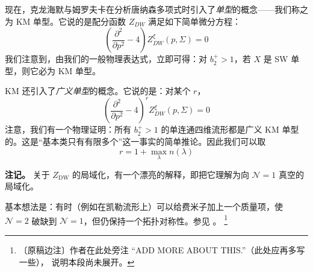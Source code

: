 现在，克龙海默与姆罗夫卡在分析唐纳森多项式时引入了\emph{单型}的概念——我们称之为 KM 单型。它说的是配分函数 $Z_{DW}$ 满足如下简单微分方程：
\begin{equation}
\left(\frac{\partial^{2}}{\partial p^{2}}-4\right)Z_{DW}^{\xi}(p,\Sigma)=0
\tag{9.2}
\end{equation}
我们注意到，由我们的一般物理表达式，立即可得：对 $b_2^{+}>1$，若 $X$ 是 SW 单型，则它必为 KM 单型。

KM 还引入了\emph{广义单型}的概念。它说的是：对某个 $r$，
\begin{equation}
\left(\frac{\partial^{2}}{\partial p^{2}}-4\right)^{r}Z_{DW}^{\xi}(p,\Sigma)=0
\tag{9.3}
\end{equation}
注意，我们有一个物理证明：所有 $b_2^{+}>1$ 的单连通四维流形都是广义 KM 单型的。这是“基本类只有有限多个”这一事实的简单推论。因此我们可以取
\begin{equation}
r=1+\max_{\lambda}n(\lambda)
\tag{9.4}
\end{equation}


\begin{remark*}
\textbf{注记。} 关于 $Z_{\mathrm{DW}}$ 的局域化，有一个漂亮的解释，即把它理解为向
$\mathcal{N}=1$ 真空的局域化。

基本想法是：有时（例如在凯勒流形上）可以给费米子加上一个质量项，使
$\mathcal{N}=2$ 破缺到 $\mathcal{N}=1$，但仍保持一个拓扑对称性。参见 \cite{ref54}。
\footnote{〔原稿边注〕作者在此处旁注 ``ADD MORE ABOUT THIS.''（此处应再多写一些），
说明本段尚未展开。}
\end{remark*}
